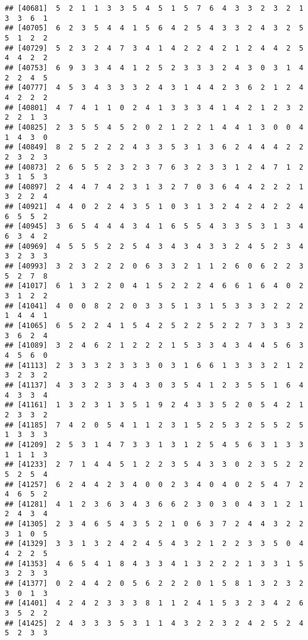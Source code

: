\documentclass[
]{article}
\begin{document}
\begin{verbatim}
## [40681]  5  2  1  1  3  3  5  4  5  1  5  7  6  4  3  3  2  3  2  1  3  3  6  1
## [40705]  6  2  3  5  4  4  1  5  6  4  2  5  4  3  3  2  4  3  2  5  5  1  2  2
## [40729]  5  2  3  2  4  7  3  4  1  4  2  2  4  2  1  2  4  4  2  5  4  4  2  2
## [40753]  6  9  3  3  4  4  1  2  5  2  3  3  3  2  4  3  0  3  1  4  2  2  4  5
## [40777]  4  5  3  4  3  3  3  2  4  3  1  4  4  2  3  6  2  1  2  4  4  2  2  2
## [40801]  4  7  4  1  1  0  2  4  1  3  3  3  4  1  4  2  1  2  3  2  2  2  1  3
## [40825]  2  3  5  5  4  5  2  0  2  1  2  2  1  4  4  1  3  0  0  4  1  4  3  0
## [40849]  8  2  5  2  2  2  4  3  3  5  3  1  3  6  2  4  4  4  2  2  2  3  2  3
## [40873]  2  6  5  5  2  3  2  3  7  6  3  2  3  3  1  2  4  7  1  2  3  1  5  3
## [40897]  2  4  4  7  4  2  3  1  3  2  7  0  3  6  4  4  2  2  2  1  3  2  2  4
## [40921]  4  4  0  2  2  4  3  5  1  0  3  1  3  2  4  2  4  2  2  4  6  5  5  2
## [40945]  3  6  5  4  4  4  3  4  1  6  5  5  4  3  3  5  3  1  3  4  6  3  4  2
## [40969]  4  5  5  5  2  2  5  4  3  4  3  4  3  3  2  4  5  2  3  4  3  2  3  3
## [40993]  3  2  3  2  2  2  0  6  3  3  2  1  1  2  6  0  6  2  2  3  5  2  7  8
## [41017]  6  1  3  2  2  0  4  1  5  2  2  2  4  6  6  1  6  4  0  2  3  1  2  2
## [41041]  4  0  0  8  2  2  0  3  3  5  1  3  1  5  3  3  3  2  2  2  1  4  4  1
## [41065]  6  5  2  2  4  1  5  4  2  5  2  2  5  2  2  7  3  3  3  2  3  6  2  4
## [41089]  3  2  4  6  2  1  2  2  2  1  5  3  3  4  3  4  4  5  6  3  4  5  6  0
## [41113]  2  3  3  3  2  3  3  3  0  3  1  6  6  1  3  3  3  2  1  2  3  2  3  2
## [41137]  4  3  3  2  3  3  4  3  0  3  5  4  1  2  3  5  5  1  6  4  4  3  3  4
## [41161]  1  3  2  3  1  3  5  1  9  2  4  3  3  5  2  0  5  4  2  1  2  3  3  2
## [41185]  7  4  2  0  5  4  1  1  2  3  1  5  2  5  3  2  5  5  2  5  1  3  3  3
## [41209]  2  5  3  1  4  7  3  3  1  3  1  2  5  4  5  6  3  1  3  3  1  1  1  3
## [41233]  2  7  1  4  4  5  1  2  2  3  5  4  3  3  0  2  3  5  2  2  5  2  5  4
## [41257]  6  2  4  4  2  3  4  0  0  2  3  4  0  4  0  2  5  4  7  2  4  6  5  2
## [41281]  4  1  2  3  6  3  4  3  6  6  2  3  0  3  0  4  3  1  2  1  2  4  3  4
## [41305]  2  3  4  6  5  4  3  5  2  1  0  6  3  7  2  4  4  3  2  2  3  1  0  5
## [41329]  3  3  1  3  2  4  2  4  5  4  3  2  1  2  2  3  3  5  0  4  4  2  2  5
## [41353]  4  6  5  4  1  8  4  3  3  4  1  3  2  2  2  1  3  3  1  5  3  2  3  3
## [41377]  0  2  4  4  2  0  5  6  2  2  2  0  1  5  8  1  3  2  3  2  3  0  1  3
## [41401]  4  2  4  2  3  3  3  8  1  1  2  4  1  5  3  2  3  4  2  6  3  5  2  2
## [41425]  2  4  3  3  3  5  3  1  1  4  3  2  2  3  2  4  2  5  2  4  5  2  3  3

\end{verbatim}
\end{document}
